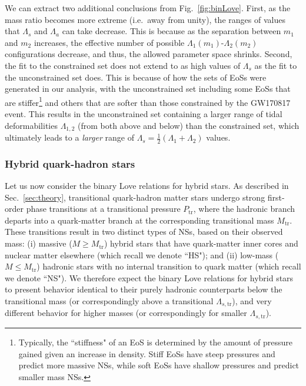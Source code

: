 \documentclass[prd,twocolumn,nofootinbib,superscriptaddress,amsmath,amssymb]{revtex4-1}
\begin{document}
We can extract two additional conclusions from Fig.~\ref{fig:binLove}. First, as the mass ratio becomes more extreme (i.e.~away from unity), the ranges of values that $\Lambda_s$ and $\Lambda_a$ can take decrease. This is because as the separation between $m_1$ and $m_2$ increases, the effective number of possible $\Lambda_1(m_1)$-$\Lambda_2(m_2)$ configurations decrease, and thus, the allowed parameter space shrinks. Second, the fit to the constrained set does not extend to as high values of $\Lambda_s$ as the fit to the unconstrained set does. This is because of how the sets of EoSs were generated in our analysis, with the unconstrained set including some EoSs that are stiffer\footnote{Typically, the ``stiffness" of an EoS is determined by the amount of pressure gained given an increase in density. Stiff EoSs have steep pressures and predict more massive NSs, while soft EoSs have shallow pressures and predict smaller mass NSs.} and others that are softer than those constrained by the GW170817 event. This results in the unconstrained set  containing a larger range of tidal deformabilities $\Lambda_{1,2}$ (from both above and below) than the constrained set, which ultimately leads to a \emph{larger} range of $\Lambda_s=\frac{1}{2}(\Lambda_1+\Lambda_2)$ values.

\subsubsection{Hybrid quark-hadron stars}

Let us now consider the binary Love relations for hybrid stars. As described in Sec.~\ref{sec:theory}, transitional quark-hadron matter stars undergo strong first-order phase transitions at a transitional pressure $P_{\text{tr}}$, where the hadronic branch departs into a quark-matter branch at the corresponding transitional mass $M_{\text{tr}}$. These transitions result in two distinct types of NSs, based on their observed mass: (i) massive ($M \geq M_{\text{tr}}$) hybrid stars that have quark-matter inner cores and nuclear matter elsewhere (which recall we denote ``HS"); and (ii) low-mass ($M \leq M_{\text{tr}}$) hadronic stars with no internal transition to quark matter (which recall we denote ``NS"). We therefore expect the binary Love relations for hybrid stars to present behavior identical to their purely hadronic counterparts below the transitional mass (or correspondingly above a transitional $\Lambda_{s,\textrm{tr}}$), and very different behavior for higher masses (or correspondingly for smaller $\Lambda_{s,\textrm{tr}}$). 
\end{document}
